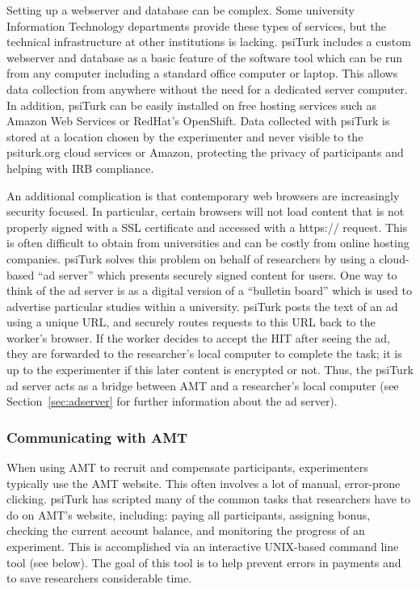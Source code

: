 \documentclass[twocolumn]{svjour3}          %
\newcommand{\psiturk}[0]{\textsf{psiTurk}}
\begin{document}
Setting up a webserver and database can be complex.  Some university Information
Technology departments
provide these types of services, but the technical infrastructure at other 
institutions is lacking.  \psiturk{} includes a custom webserver and database
as a basic feature of the software tool which can be run from any computer
including a standard office computer or laptop.  This allows data collection from
anywhere without the need for a dedicated server computer.  In addition, \psiturk{}
can be easily installed on free hosting services such as Amazon Web Services
or RedHat's OpenShift.  Data collected with \psiturk{} is stored at a location
chosen by the experimenter and never visible to the \textsf{psiturk.org} cloud
services or Amazon, protecting the privacy of participants and helping with IRB compliance.

An additional complication is that contemporary web browsers are increasingly security
focused.  In particular, certain browsers will not load content that is not properly 
signed with a SSL certificate and accessed with a \textsf{https://} request.  This
is often difficult to obtain from universities and can be costly from online
hosting companies.  \psiturk{} solves this problem on behalf of researchers by
using a cloud-based ``ad server'' which presents securely signed
content for users.  One way to think of the ad server is as a digital
version of a ``bulletin board'' which is used to advertise particular
studies within a university.  \psiturk{}
posts the text of an ad using a unique URL, and securely routes requests to this URL
back to the worker's browser.  If the worker decides to accept the HIT after seeing the ad,
they are forwarded to the researcher's local computer to complete the task; it is up to the
experimenter if this later content is encrypted or not. Thus, 
the \psiturk{} ad server acts as a bridge between AMT and 
a researcher's local computer (see Section~\ref{sec:adserver} for further information 
about the ad server). 


\subsubsection{Communicating with AMT}

When using AMT to recruit and compensate participants,
experimenters typically use the AMT website.  This often
involves a lot of manual, error-prone clicking.   \psiturk{}
has scripted many of the common
tasks that researchers have to do on AMT's website, including:
paying all participants, assigning bonus, checking the current
account balance, and monitoring the progress of an experiment.
This is accomplished via an interactive UNIX-based command
line tool (see below).
The goal of this tool is to help prevent errors in payments and
to save researchers considerable time.
\end{document}
